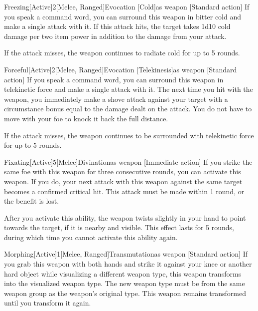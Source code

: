 \begin{magicitemdef}{Freezing}[Active]{2}[Melee, Ranged]{Evocation [Cold]}{as weapon}
    [Standard action] If you speak a command word, you can surround this weapon in bitter cold and make a single attack with it. If this attack hits, the target takes 1d10 cold damage per two item power in addition to the damage from your attack.

    If the attack misses, the weapon continues to radiate cold for up to 5 rounds.
\end{magicitemdef}

\begin{magicitemdef}{Forceful}[Active]{2}[Melee, Ranged]{Evocation [Telekinesis]}{as weapon}
    [Standard action] If you speak a command word, you can surround this weapon in telekinetic force and make a single attack with it. The next time you hit with the weapon, you immediately make a shove attack against your target with a circumstance bonus equal to the damage dealt on the attack. You do not have to move with your foe to knock it back the full distance.

    If the attack misses, the weapon continues to be surrounded with telekinetic force for up to 5 rounds.
\end{magicitemdef}

\begin{magicitemdef}{Fixating}[Active]{5}[Melee]{Divination}{as weapon}
    [Immediate action] If you strike the same foe with this weapon for three consecutive rounds, you can activate this weapon.
    If you do, your next attack with this weapon against the same target becomes a confirmed critical hit.
    This attack must be made within 1 round, or the benefit is lost.

    After you activate this ability, the weapon twists slightly in your hand to point towards the target, if it is nearby and visible.
    This effect lasts for 5 rounds, during which time you cannot activate this ability again.
\end{magicitemdef}

\begin{magicitemdef}{Morphing}[Active]{1}[Melee, Ranged]{Transmutation}{as weapon}
    [Standard action] If you grab this weapon with both hands and strike it against your knee or another hard object while visualizing a different weapon type, this weapon transforms into the visualized weapon type.
    The new weapon type must be from the same weapon group as the weapon's original type.
    This weapon remains transformed until you transform it again.
\end{magicitemdef}

